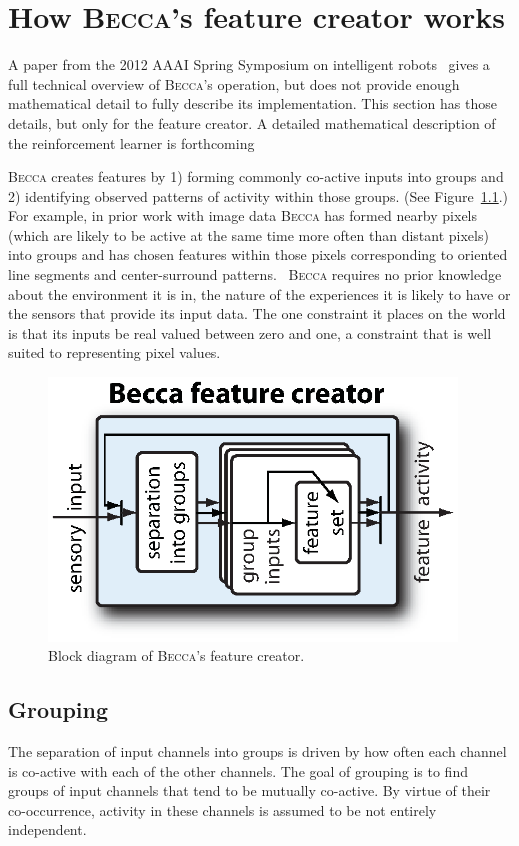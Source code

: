 ﻿\chapter{How \textsc{Becca}'s feature creator works}

A paper from the 2012 AAAI Spring Symposium on intelligent robots~\cite{rohrer12b} gives a full technical overview of \textsc{Becca}'s operation, but does not provide enough mathematical detail to fully describe its implementation. This section has those details, but only for the feature creator. A detailed mathematical description of the reinforcement learner is forthcoming

\textsc{Becca} creates features by 1) forming commonly co-active inputs into groups and 2) identifying observed patterns of activity within those groups. (See Figure~\ref{becca_feature_creator}.) For example, in prior work with image data \textsc{Becca} has formed nearby pixels (which are likely to be active at the same time more often than distant pixels) into groups and has chosen features within those pixels corresponding to oriented line segments and center-surround patterns.~\cite{rohrer11c} \textsc{Becca} requires no prior knowledge about the environment it is in, the nature of the experiences it is likely to have or the sensors that provide its input data. The one constraint it places on the world is that its inputs be real valued between zero and one, a constraint that is well suited to representing pixel values.

\begin{figure}
\centering
\includegraphics[height=7cm]{figs/becca_feature_creator.eps}
\caption{Block diagram of \textsc{Becca}'s feature creator.}
\label{becca_feature_creator}
\end{figure}


\section{Grouping}
The separation of input channels into groups is driven by how often each channel is co-active with each of the other channels. The goal of grouping is to find groups of input channels that tend to be mutually co-active. By virtue of their co-occurrence, activity in these channels is assumed to be not entirely independent.

